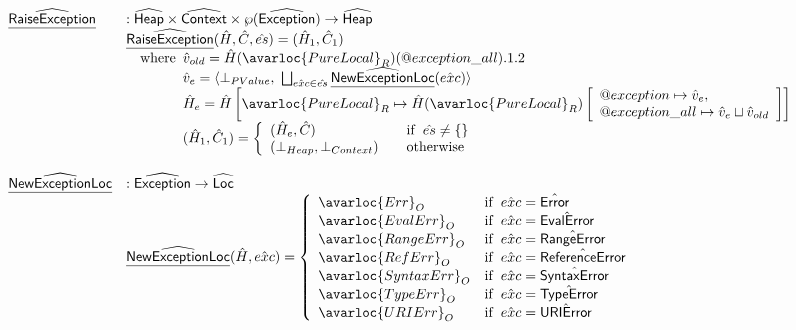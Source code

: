\[\begin{array}{ll}
\ahf{RaiseException} & : \aHeap \times \abs{Context} \times \powerset{\abs{Exception}} \rightarrow \aHeap\\
 & \ahf{RaiseException}(\hat{H},\hat{C}, \hat{es}) = (\hat{H}_1, \hat{C}_1) \\
 & \quad\wherec{
   \hat{v}_{old} = \hat{H}(\avarloc{PureLocal}_R)(\varprop{exception\_all}).1.2 \\
   \hat{v}_e = \langle \bot_{PValue},\ \bigsqcup_{\hat{exc}\in\hat{es}}\ahf{NewExceptionLoc}(\hat{exc}) \rangle \\
   \hat{H}_e = \hat{H}\left[\avarloc{PureLocal}_R\mapsto \hat{H}(\avarloc{PureLocal}_R)
     \left[\begin{array}{l}
         \varprop{exception}\mapsto \hat{v}_e, \\
         \varprop{exception\_all}\mapsto \hat{v}_e \sqcup \hat{v}_{old} 
     \end{array}\right]\right]\\
   (\hat{H}_1, \hat{C}_1) = \left\{
     \begin{array}{ll}
       (\hat{H}_e, \hat{C})&\quad\ifc{\hat{es} \neq \{\}}\\
       (\bot_{Heap}, \bot_{Context}) &\quad\owc
     \end{array}
   \right.\\
}\\
\\

\ahf{NewExceptionLoc} & : \abs{Exception} \rightarrow \abs{Loc} \\
 & \ahf{NewExceptionLoc}(\hat{H},\hat{exc}) =
 \left\{
   \begin{array}{ll}
     \avarloc{Err}_O & \ifc{\hat{exc} = \hat{\exc{Error}}} \\
     \avarloc{EvalErr}_O & \ifc{\hat{exc} = \hat{\exc{EvalError}}} \\
     \avarloc{RangeErr}_O & \ifc{\hat{exc} = \hat{\exc{RangeError}}} \\
     \avarloc{RefErr}_O & \ifc{\hat{exc} = \hat{\exc{ReferenceError}}} \\
     \avarloc{SyntaxErr}_O & \ifc{\hat{exc} = \hat{\exc{SyntaxError}}} \\
     \avarloc{TypeErr}_O & \ifc{\hat{exc} = \hat{\exc{TypeError}}} \\
     \avarloc{URIErr}_O & \ifc{\hat{exc} = \hat{\exc{URIError}}} \\
   \end{array}
 \right.\\
\\


\end{array}\]
